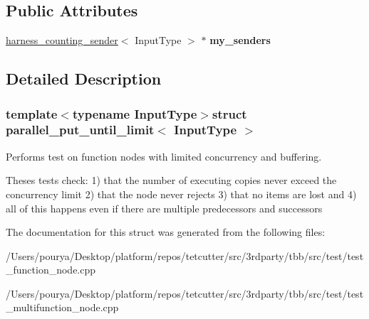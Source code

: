 \subsection*{Public Attributes}
\begin{DoxyCompactItemize}
\item 
\hypertarget{structparallel__put__until__limit_a950728ca715c15400df02e9fd837994a}{}\hyperlink{structharness__counting__sender}{harness\+\_\+counting\+\_\+sender}$<$ Input\+Type $>$ $\ast$ {\bfseries my\+\_\+senders}\label{structparallel__put__until__limit_a950728ca715c15400df02e9fd837994a}

\end{DoxyCompactItemize}


\subsection{Detailed Description}
\subsubsection*{template$<$typename Input\+Type$>$struct parallel\+\_\+put\+\_\+until\+\_\+limit$<$ Input\+Type $>$}

Performs test on function nodes with limited concurrency and buffering. 

Theses tests check\+: 1) that the number of executing copies never exceed the concurrency limit 2) that the node never rejects 3) that no items are lost and 4) all of this happens even if there are multiple predecessors and successors 

The documentation for this struct was generated from the following files\+:\begin{DoxyCompactItemize}
\item 
/\+Users/pourya/\+Desktop/platform/repos/tetcutter/src/3rdparty/tbb/src/test/test\+\_\+function\+\_\+node.\+cpp\item 
/\+Users/pourya/\+Desktop/platform/repos/tetcutter/src/3rdparty/tbb/src/test/test\+\_\+multifunction\+\_\+node.\+cpp\end{DoxyCompactItemize}
